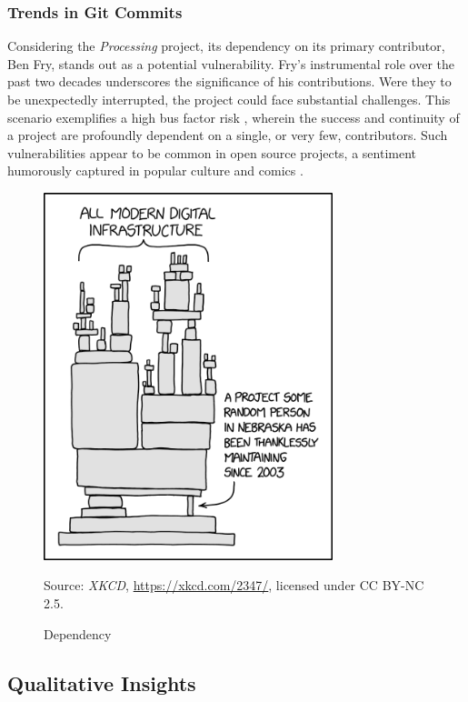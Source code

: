 \documentclass{article}
\begin{document}
\subsubsection{Trends in Git Commits}

Considering the \textit{Processing} project, its dependency on its primary contributor, Ben Fry, stands out as a potential vulnerability. Fry's instrumental role over the past two decades underscores the significance of his contributions. Were they to be unexpectedly interrupted, the project could face substantial challenges. This scenario exemplifies a high bus factor risk \parencite{BusFactor2023}, wherein the success and continuity of a project are profoundly dependent on a single, or very few, contributors. Such vulnerabilities appear to be common in open source projects, a sentiment humorously captured in popular culture and comics \parencite{munroeDependency2020}.

\begin{figure}[h!] 
    \centering
    \includegraphics[width=0.75\textwidth]{dependency.png} 
    \caption{Dependency}
    \label{fig:dependency_comic}
    \small Source: \textit{XKCD}, \url{https://xkcd.com/2347/}, licensed under CC BY-NC 2.5.
\end{figure}


\subsection{Qualitative Insights}
\end{document}

